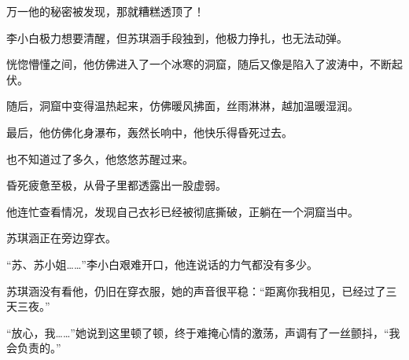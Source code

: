\begin{this_body}
万一他的秘密被发现，那就糟糕透顶了！

李小白极力想要清醒，但苏琪涵手段独到，他极力挣扎，也无法动弹。

恍惚懵懂之间，他仿佛进入了一个冰寒的洞窟，随后又像是陷入了波涛中，不断起伏。

随后，洞窟中变得温热起来，仿佛暖风拂面，丝雨淋淋，越加温暖湿润。

最后，他仿佛化身瀑布，轰然长响中，他快乐得昏死过去。

也不知道过了多久，他悠悠苏醒过来。

昏死疲惫至极，从骨子里都透露出一股虚弱。

他连忙查看情况，发现自己衣衫已经被彻底撕破，正躺在一个洞窟当中。

苏琪涵正在旁边穿衣。

“苏、苏小姐……”李小白艰难开口，他连说话的力气都没有多少。

苏琪涵没有看他，仍旧在穿衣服，她的声音很平稳：“距离你我相见，已经过了三天三夜。”

“放心，我……”她说到这里顿了顿，终于难掩心情的激荡，声调有了一丝颤抖，“我会负责的。”

\end{this_body}

